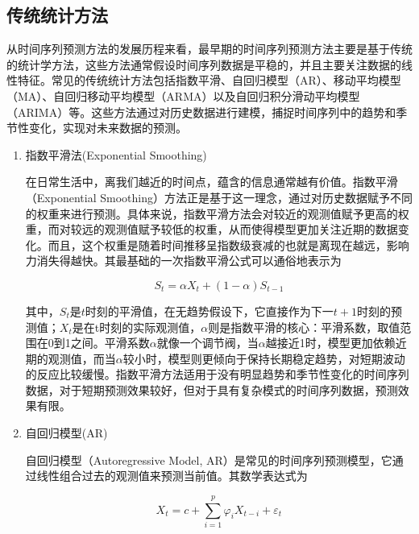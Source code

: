 \subsection{传统统计方法}

从时间序列预测方法的发展历程来看，最早期的时间序列预测方法主要是基于传统的统计学方法，这些方法通常假设时间序列数据是平稳的，并且主要关注数据的线性特征。常见的传统统计方法包括指数平滑、自回归模型（AR）、移动平均模型（MA）、自回归移动平均模型（ARMA）以及自回归积分滑动平均模型（ARIMA）等。这些方法通过对历史数据进行建模，捕捉时间序列中的趋势和季节性变化，实现对未来数据的预测。

\begin{enumerate}[label=（\arabic*）, leftmargin=0pt, itemindent=4.5em, labelsep=0.5em, listparindent=2em, parsep=0pt,]

    \item 指数平滑法(Exponential Smoothing)
    
    在日常生活中，离我们越近的时间点，蕴含的信息通常越有价值。指数平滑（Exponential Smoothing）方法正是基于这一理念，通过对历史数据赋予不同的权重来进行预测。具体来说，指数平滑方法会对较近的观测值赋予更高的权重，而对较远的观测值赋予较低的权重，从而使得模型更加关注近期的数据变化。而且，这个权重是随着时间推移呈指数级衰减的也就是离现在越远，影响力消失得越快。其最基础的一次指数平滑公式可以通俗地表示为

    \begin{equation}
        S_t = \alpha X_t + (1-\alpha) S_{t-1}
    \end{equation}

    其中，$S_t$是$t$时刻的平滑值，在无趋势假设下，它直接作为下一$t+1$时刻的预测值；$X_t$是在t时刻的实际观测值，$\alpha$则是指数平滑的核心：平滑系数，取值范围在0到1之间。平滑系数$\alpha$就像一个调节阀，当$\alpha$越接近1时，模型更加依赖近期的观测值，而当$\alpha$较小时，模型则更倾向于保持长期稳定趋势，对短期波动的反应比较缓慢。指数平滑方法适用于没有明显趋势和季节性变化的时间序列数据，对于短期预测效果较好，但对于具有复杂模式的时间序列数据，预测效果有限。

    \item 自回归模型(AR)
    
    自回归模型（Autoregressive Model, AR）是常见的时间序列预测模型，它通过线性组合过去的观测值来预测当前值。其数学表达式为

    \begin{equation}
        X_t = c + \sum_{i=1}^{p} \varphi_i X_{t-i} + \varepsilon_t
    \end{equation}


\end{enumerate}
